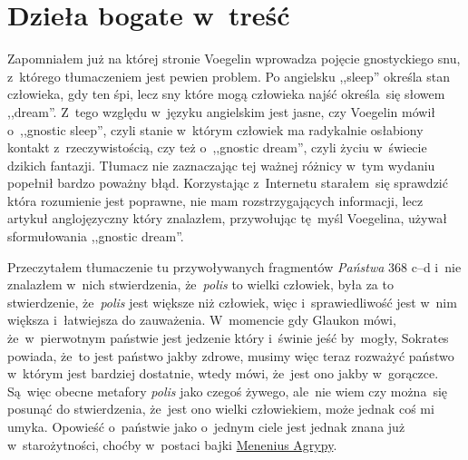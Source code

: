 \documentclass[a4paper,11pt]{article}
\begin{document}
\vspace{\spaceTwo}





\newpage
\section{Dzieła bogate w~treść}

\vspace{\spaceTwo}






\start Zapomniałem już na której stronie Voegelin wprowadza pojęcie
gnostyckiego snu, z~którego tłumaczeniem jest pewien problem. Po
angielsku ,,sleep'' określa stan człowieka, gdy ten śpi, lecz sny
które mogą człowieka najść określa~się słowem ,,dream''. Z~tego
względu w~języku angielskim jest jasne, czy Voegelin mówił o~,,gnostic
sleep'', czyli stanie w~którym człowiek ma radykalnie osłabiony
kontakt z~rzeczywistością, czy też o~,,gnostic dream'', czyli życiu
w~świecie dzikich fantazji. Tłumacz nie zaznaczając tej ważnej różnicy
w~tym wydaniu popełnił bardzo poważny błąd. Korzystając z~Internetu
starałem~się sprawdzić która rozumienie jest poprawne, nie mam
rozstrzygających informacji, lecz artykuł anglojęzyczny który
znalazłem, przywołując tę~myśl Voegelina, używał sformułowania
,,gnostic dream''.

\vspace{\spaceFour}


\start {} Przeczytałem tłumaczenie tu przywoływanych fragmentów
\emph{Państwa} 368 c--d i~nie znalazłem w~nich stwierdzenia,
że~\emph{polis} to wielki człowiek, była za to stwierdzenie,
że~\emph{polis} jest większe niż człowiek, więc i~sprawiedliwość jest
w~nim większa i~łatwiejsza do zauważenia. W~momencie gdy Glaukon mówi,
że~w~pierwotnym państwie jest jedzenie który i~świnie jeść by~mogły,
Sokrates powiada, że~to jest państwo jakby zdrowe, musimy więc teraz
rozważyć państwo w~którym jest bardziej dostatnie, wtedy mówi, że~jest
ono jakby w~gorączce. Są~więc obecne metafory \emph{polis} jako czegoś
żywego, ale~nie wiem czy można~się posunąć do stwierdzenia, że~jest
ono wielki człowiekiem, może jednak coś mi umyka. Opowieść o~państwie
jako o~jednym ciele jest jednak znana już w~starożytności, choćby
w~postaci bajki
\href{https://en.wikipedia.org/wiki/Agrippa_Menenius_Lanatus_(consul_503_BC)}
{Menenius Agrypy}.
\end{document}
